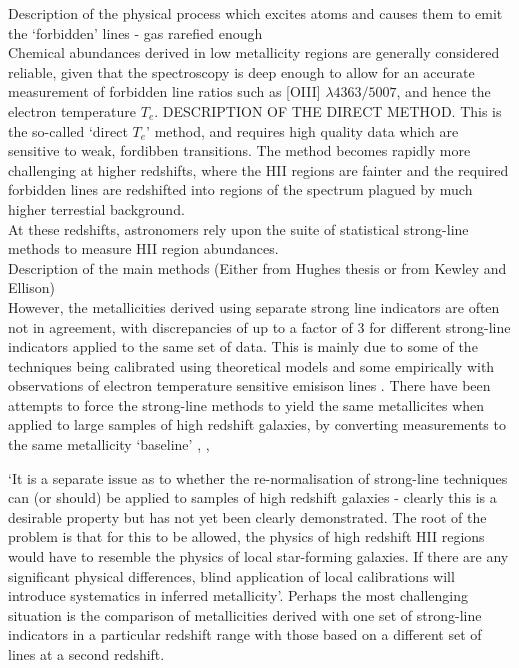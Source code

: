 \documentclass{literature}
\begin{document}
Description of the physical process which excites atoms and causes them to emit the `forbidden' lines - gas rarefied enough \\


Chemical abundances derived in low metallicity regions are generally considered reliable, given that the spectroscopy is deep enough to allow for an accurate measurement of forbidden line ratios such as [OIII] $\lambda 4363/5007$, and hence the electron temperature $T_{e}$. DESCRIPTION OF THE DIRECT METHOD. This is the so-called `direct $T_{e}$' method, and requires high quality data which are sensitive to weak, fordibben transitions. The method becomes rapidly more challenging at higher redshifts, where the HII regions are fainter and the required forbidden lines are redshifted into regions of the spectrum plagued by much higher terrestial background. \\   


 



At these redshifts, astronomers rely upon the suite of statistical strong-line methods to measure HII region abundances. \\

Description of the main methods (Either from Hughes thesis or from Kewley and Ellison) \\ 

However, the metallicities derived using separate strong line indicators are often not in agreement, with discrepancies of up to a factor of 3 for different strong-line indicators applied to the same set of data. This is mainly due to some of the techniques being calibrated using theoretical models and some empirically with observations of electron temperature sensitive emisison lines \citep{Stasinska2005}. There have been attempts to force the strong-line methods to yield the same metallicites when applied to large samples of high redshift galaxies, by converting measurements to the same metallicity `baseline' \citep{Kewley_2008}, \citep{Kewley2002}, \citep{Maiolino2008}

`It is a separate issue as to whether the re-normalisation of strong-line techniques can (or should) be applied to samples of high redshift galaxies - clearly this is a desirable property but has not yet been clearly demonstrated. The root of the problem is that for this to be allowed, the physics of high redshift HII regions would have to resemble the physics of local star-forming galaxies. If there are any significant physical differences, blind application of local calibrations will introduce systematics in inferred metallicity'. Perhaps the most challenging situation is the comparison of metallicities derived with one set of strong-line indicators in a particular redshift range with those based on a different set of lines at a second redshift. 
\end{document}
